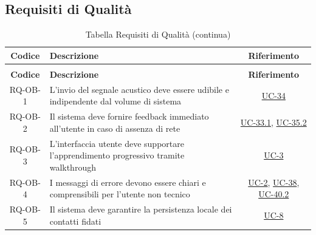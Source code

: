 \documentclass[a4paper,12pt]{article}
\begin{document}
\subsection{Requisiti di Qualità} \label{subsection:requisiti_qualita}
\begin{center}
\renewcommand{\arraystretch}{1.5}
\begin{longtable}{|c|p{9cm}|c|}
\caption{Tabella Requisiti di Qualità} \label{tab:requisiti_qualita} \\
\hline
\rowcolor{gray!60}
\textbf{Codice} & \textbf{Descrizione} & \textbf{Riferimento} \\
\hline
\endfirsthead
\caption[]{Tabella Requisiti di Qualità (continua)} \\
\hline
\rowcolor{gray!60}
\textbf{Codice} & \textbf{Descrizione} & \textbf{Riferimento} \\
\hline
\endhead
\rowcolor{white}
RQ-OB-1 & L'invio del segnale acustico deve essere udibile e indipendente dal volume di sistema & \hyperref[sec:UC-34]{UC-34} \\
\hline
\rowcolor{gray!20}
RQ-OB-2 & Il sistema deve fornire feedback immediato all'utente in caso di assenza di rete & \hyperref[sec:UC-33.1]{UC-33.1}, \hyperref[sec:UC-35.2]{UC-35.2} \\
\hline
\rowcolor{white}
RQ-OB-3 & L'interfaccia utente deve supportare l'apprendimento progressivo tramite walkthrough & \hyperref[subsec:UC-3]{UC-3} \\
\hline
\rowcolor{gray!20}
RQ-OB-4 & I messaggi di errore devono essere chiari e comprensibili per l'utente non tecnico & \hyperref[subsec:UC-2]{UC-2}, \hyperref[sec:UC-38]{UC-38}, \hyperref[subsec:UC-40.2]{UC-40.2} \\
\hline
\rowcolor{white}
RQ-OB-5 & Il sistema deve garantire la persistenza locale dei contatti fidati & \hyperref[subsec:UC-8]{UC-8} \\
\hline
\end{longtable}
\end{center}
\end{document}
